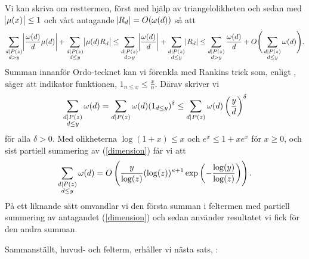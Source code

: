 Vi kan skriva om resttermen, först med hjälp av triangelolikheten och sedan med $\abs{\mu(x)} \leq 1$ och vårt antagande $\abs{R_d} = O(\omega(d))$ så att
\begin{align*}
    \sum_{\substack{d \mid P(z) \\ d > y}} \abs{\frac{\omega(d)}{d} \mu(d)} + \sum_{\substack{d \mid P(z)  \\ d \leq y}} \abs{ \mu(d) R_d} \leq 
    \sum_{\substack{d \mid P(z) \\ d > y}} \abs{\frac{\omega(d)}{d}} + \sum_{\substack{d \mid P(z)  \\ d \leq y}} \abs{R_d} \leq
    \sum_{\substack{d \mid P(z) \\ d > y}} \frac{\omega(d)}{d} + O\Bigg(\sum_{\substack{d \mid P(z)  \\ d \leq y}} \omega(d)\Bigg).
\end{align*}
Summan innanför Ordo-tecknet kan vi förenkla med Rankins trick som, enligt \cite{Tao}, säger att indikator funktionen, \(1_{n \leq x} \leq \frac{x}{n}\). Därav skriver vi 
\begin{align*}
    \sum_{\substack{d \mid P(z)  \\ d \leq y}} \omega(d) =
    \sum_{\substack{d \mid P(z)}} \omega(d) (1_{d \leq y})^{\delta} \leq
    \sum_{\substack{d \mid P(z)}} \omega(d) \left(\frac{y}{d}\right)^{\delta}  
\end{align*}
för alla \(\delta > 0\). Med olikheterna \(\log(1 + x) \leq x\) och \(e^x \leq 1 + x e^x\) för $x \geq 0$, och sist partiell summering av (\ref{dimension}) får vi att
\begin{align*}
    \sum_{\substack{d \mid P(z)  \\ d \leq y}} \omega(d) = O\left( \frac{y}{\log(z)} (\log(z))^{\kappa + 1} \exp{\left(- \frac{\log(y)}{\log(z)} \right)} \right).
\end{align*}
På ett liknande sätt omvandlar vi den första summan i feltermen med partiell summering av antagandet (\ref{dimension}) och sedan använder resultatet vi fick för den andra summan. 

Sammanställt, huvud- och felterm, erhåller vi nästa sats, \cite[Sats 5.4.1]{cojocarumurty}:

